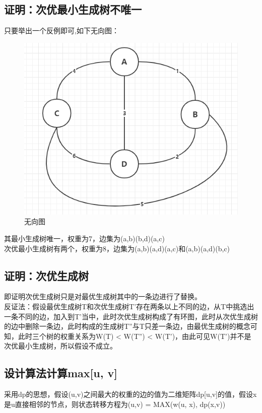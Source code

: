 \documentclass[UTF8]{ctexart}
\begin{document}
\subsection{证明：次优最小生成树不唯一}
只要举出一个反例即可,如下无向图：
\begin{figure}[H]
    \centering
    \includegraphics[width=1\textwidth]{img/img1.png}
    \caption{无向图}
    \label{img1}
\end{figure}
其最小生成树唯一，权重为7，边集为(a,b)(b,d)(a,c)\\
次优最小生成树有两个，权重为8，边集为(a,b)(a,d)(a,c)和(a,b)(a,d)(b,c)

\subsection{证明：次优生成树}
即证明次优生成树只是对最优生成树其中的一条边进行了替换。\\
反证法：假设最优生成树T和次优生成树T'存在两条以上不同的边，从T中挑选出一条不同的边，加入到T'当中，此时次优生成树构成了有环图，此时从次优生成树的边中删除一条边，此时构成的生成树T''与T只差一条边，由最优生成树的概念可知，此时三个树的权重关系为W(T) < W(T'') < W(T')，由此可见W(T')并不是次优最小生成树，所以假设不成立。

\subsection{设计算法计算max[u, v]}
采用dp的思想，假设(u,v)之间最大的权重的边的值为二维矩阵dp[u,v]的值，假设x是u直接相邻的节点，则状态转移方程为(u,v) = MAX(w(u, x), dp(x,v))\\
\end{document}
